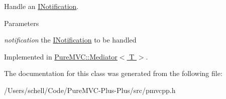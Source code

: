 Handle an {\ttfamily \hyperlink{class_pure_m_v_c_1_1_i_notification}{INotification}}. 
\begin{DoxyParams}{Parameters}
\item[{\em notification}]the {\ttfamily \hyperlink{class_pure_m_v_c_1_1_i_notification}{INotification}} to be handled \end{DoxyParams}


Implemented in \hyperlink{class_pure_m_v_c_1_1_mediator_a869785c4f70518e40eaae7395c5f1d48}{PureMVC::Mediator$<$ T $>$}.

The documentation for this class was generated from the following file:\begin{DoxyCompactItemize}
\item 
/Users/schell/Code/PureMVC-\/Plus-\/Plus/src/pmvcpp.h\end{DoxyCompactItemize}
